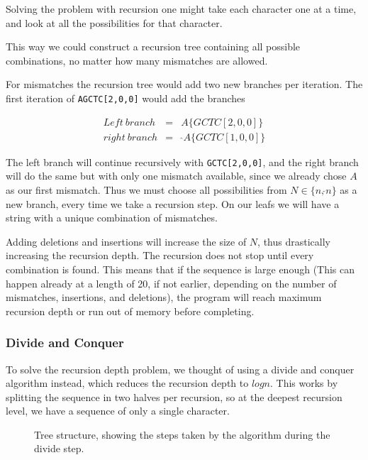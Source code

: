 \documentclass[12pt]{article}
\begin{document}
Solving the problem with recursion one might take each character one at a time, and look at all the possibilities for that character.

This way we could construct a recursion tree containing all possible combinations, no matter how many mismatches are allowed.

For mismatches the recursion tree would add two new branches per iteration. The first iteration of \texttt{AGCTC[2,0,0]} would add the branches

\begin{eqnarray}
	Left\ branch &=& A\{GCTC[2,0,0]\} \\
	right\ branch &=&\ \hat{}A\{GCTC[1,0,0]\}
\end{eqnarray}

The left branch will continue recursively with \texttt{GCTC[2,0,0]}, and the right branch will do the same but with only one mismatch available, since we already chose $A$ as our first mismatch. Thus we must choose all possibilities from $N \in \{n, \hat{}n\}$ as a new branch, every time we take a recursion step.
On our leafs we will have a string with a unique combination of mismatches.

Adding deletions and insertions will increase the size of $N$, thus drastically increasing the recursion depth. The recursion does not stop until every combination is found. This means that if the sequence is large enough (This can happen already at a length of 20, if not earlier, depending on the number of mismatches, insertions, and deletions), the program will reach maximum recursion depth or run out of memory before completing.

\subsubsection{Divide and Conquer}

To solve the recursion depth problem, we thought of using a divide and conquer algorithm instead, which reduces the recursion depth to $logn$. This works by splitting the sequence in two halves per recursion, so at the deepest recursion level, we have a sequence of only a single character.

\begin{figure}[H]
	\centering
	\caption{Tree structure, showing the steps taken by the algorithm during the divide step.}
	\label{fig:tree_example}
\end{figure}
\end{document}
